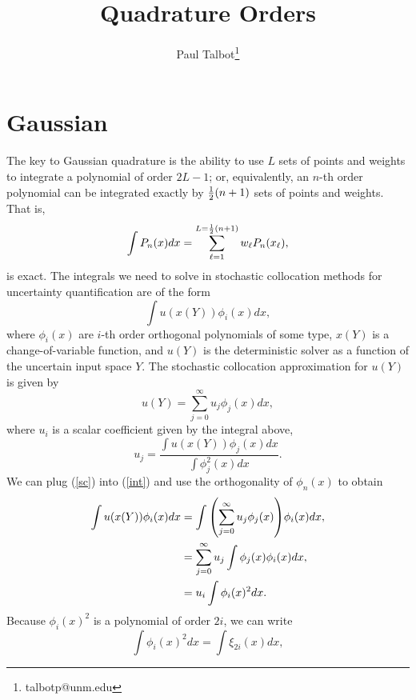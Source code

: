 \documentclass[11pt]{article}
\begin{document}
\title{Quadrature Orders}

\author[]{Paul Talbot\thanks{talbotp@unm.edu}}
\renewcommand\Authands{ and }
\maketitle

\section{Gaussian}
The key to Gaussian quadrature is the ability to use $L$ sets of points and weights to integrate a polynomial of order $2L-1$; or, equivalently, an $n$-th order polynomial can be integrated exactly by $\frac{1}{2}\qty(n+1)$ sets of points and weights.  That is,
\begin{equation}
\int P_n(x) dx = \sum_{\ell=1}^{L=\frac{1}{2}\qty(n+1)} w_\ell P_n(x_\ell),
\end{equation}
is exact.  The integrals we need to solve in stochastic collocation methods for uncertainty quantification are of the form
\begin{equation}\label{int}
\int u(x(Y)) \phi_i(x) dx,
\end{equation}
where $\phi_i(x)$ are $i$-th order orthogonal polynomials of some type, $x(Y)$ is a change-of-variable function, and $u(Y)$ is the deterministic solver as a function of the uncertain input space $Y$.  The stochastic collocation approximation for $u(Y)$ is given by
\begin{equation} \label{sc}
u(Y) = \sum_{j=0}^\infty u_j\phi_j(x) dx,
\end{equation}
where $u_i$ is a scalar coefficient given by the integral above,
\begin{equation}
u_j = \frac{\int u(x(Y)) \phi_j(x)dx}{\int \phi_j^2(x) dx}.
\end{equation}
We can plug (\ref{sc}) into (\ref{int}) and use the orthogonality of $\phi_n(x)$ to obtain
\begin{align}
\int u(x(Y)) \phi_i(x) dx &=\int \qty(\sum_{j=0}^\infty u_j\phi_j(x))\phi_i(x)dx,\\ 
  &= \sum_{j=0}^\infty u_j \int\phi_j(x)\phi_i(x)dx,\\
  &= u_i \int \phi_i(x)^2 dx.
\end{align}
Because $\phi_i(x)^2$ is a polynomial of order $2i$, we can write
\begin{equation}
\int \phi_i(x)^2 dx = \int \xi_{2i}(x) dx,
\end{equation}
\end{document}
